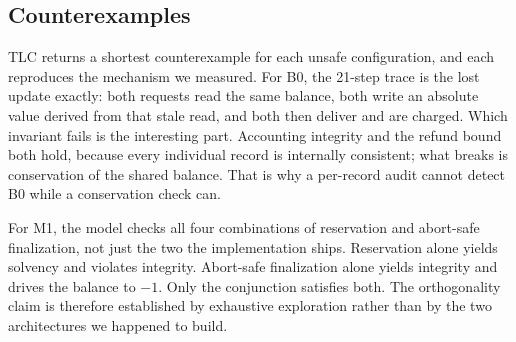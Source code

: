 \documentclass[manuscript,review,anonymous]{acmart}
\begin{document}
\begin{table}[t]
\centering
\caption{TLC model-checking results across ten architecture configurations and four
invariants. All 40 outcomes matched the expectation declared before the run.}
\label{tab:formalmatrix}
\end{table}

\subsection{Counterexamples}
TLC returns a shortest counterexample for each unsafe configuration, and each reproduces
the mechanism we measured. For B0, the 21-step trace is the lost update exactly: both
requests read the same balance, both write an absolute value derived from that stale
read, and both then deliver and are charged. Which invariant fails is the interesting
part. Accounting integrity and the refund bound both hold, because every individual
record is internally consistent; what breaks is conservation of the shared balance. That
is why a per-record audit cannot detect B0 while a conservation check can.

For M1, the model checks all four combinations of reservation and abort-safe
finalization, not just the two the implementation ships. Reservation alone yields
solvency and violates integrity. Abort-safe finalization alone yields integrity and
drives the balance to $-1$. Only the conjunction satisfies both. The orthogonality claim
is therefore established by exhaustive exploration rather than by the two architectures
we happened to build.
\end{document}
